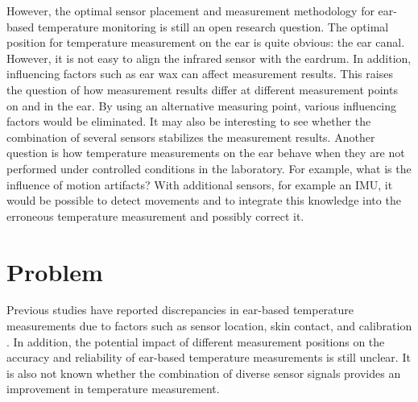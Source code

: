However, the optimal sensor placement and measurement methodology for ear-based temperature monitoring is still an open research question. 
The optimal position for temperature measurement on the ear is quite obvious: the ear canal. 
However, it is not easy to align the infrared sensor with the eardrum. In addition, influencing factors such as ear wax can affect measurement results. 
This raises the question of how measurement results differ at different measurement points on and in the ear. 
By using an alternative measuring point, various influencing factors would be eliminated.
It may also be interesting to see whether the combination of several sensors stabilizes the measurement results.
Another question is how temperature measurements on the ear behave when they are not performed under controlled conditions in the laboratory.
For example, what is the influence of motion artifacts?
With additional sensors, for example an IMU, it would be possible to detect movements and to integrate this knowledge into the erroneous temperature measurement and possibly correct it.

\section{Problem}
Previous studies have reported discrepancies in ear-based temperature measurements due to factors such as sensor location, skin contact, and calibration \cite{rohrbergTemperatureMeasurementEar1997, gasimAccuracyTympanicTemperature2013, amoateng-adjepongAccuracyInfraredTympanic1999a, hookerScreeningFeverAdult1996a, cattaneoAccuracyPrecisionBody2000}. 
In addition, the potential impact of different measurement positions on the accuracy and reliability of ear-based temperature measurements is still unclear.
It is also not known whether the combination of diverse sensor signals provides an improvement in temperature measurement.

